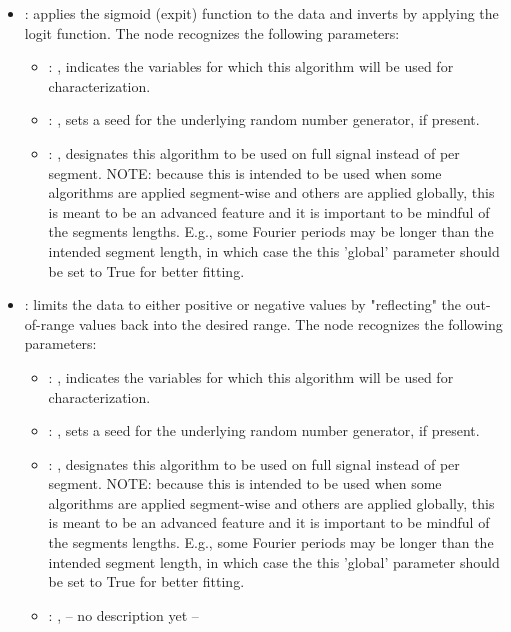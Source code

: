 \begin{itemize}
    \item {}:
      applies the sigmoid (expit) function to the data and inverts by applying
      the logit function.
      The  node recognizes the following parameters:
        \begin{itemize}
          \item {}: , 
            indicates the variables for which this algorithm will be used for characterization.
          \item {}: , 
            sets a seed for the underlying random number generator, if present.
          \item {}: , 
            designates this algorithm to be used on full signal instead of per
            segment. NOTE: because this is intended to be used when some algorithms are
            applied segment-wise and others are applied globally, this is meant to be an
            advanced feature and it is important to be mindful of the segments lengths.
            E.g., some Fourier periods may be longer than the intended segment length, in
            which case the this 'global' parameter should be set to True for better
            fitting. 
      \end{itemize}

    \item {}:
      limits the data to either positive or negative values by "reflecting" the
      out-of-range values back into the desired range.
      The  node recognizes the following parameters:
        \begin{itemize}
          \item {}: , 
            indicates the variables for which this algorithm will be used for characterization.
          \item {}: , 
            sets a seed for the underlying random number generator, if present.
          \item {}: , 
            designates this algorithm to be used on full signal instead of per
            segment. NOTE: because this is intended to be used when some algorithms are
            applied segment-wise and others are applied globally, this is meant to be an
            advanced feature and it is important to be mindful of the segments lengths.
            E.g., some Fourier periods may be longer than the intended segment length, in
            which case the this 'global' parameter should be set to True for better
            fitting. 
          \item {}: , 
            -- no description yet --
      \end{itemize}


\end{itemize}
